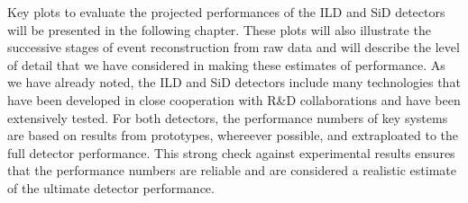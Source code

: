 




Key plots to evaluate the projected performances of the ILD and SiD
detectors will be presented in the following chapter.    These plots
will also illustrate the successive stages of event reconstruction
from raw data and will describe the level of detail that we have
considered in making these estimates of performance.  
As we have already noted, the ILD and SiD detectors include many
technologies that have been developed in close cooperation with R\&D
collaborations 
and have been extensively tested. For both detectors, the performance numbers 
of key systems are based on results from prototypes, whereever 
possible, and extraploated to the full detector performance. This
strong 
check against experimental results ensures that the performance 
numbers are reliable and are considered a realistic estimate of the ultimate detector performance. 
